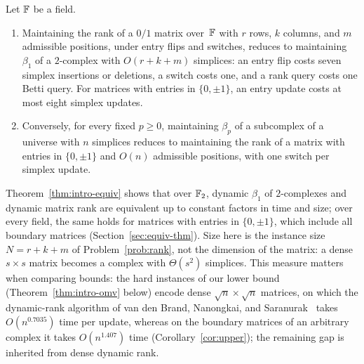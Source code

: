 \begin{theorem}\label{thm:intro-equiv}
Let $\mathbb{F}$ be a field.
\begin{enumerate}[label=(\roman*)]
\item Maintaining the rank of a $0/1$ matrix over~$\mathbb{F}$ with $r$ rows, $k$ columns, and $m$ admissible positions, under entry flips and switches, reduces to maintaining $\beta_1$ of a $2$-complex with $O(r+k+m)$ simplices: an entry flip costs seven simplex insertions or deletions, a switch costs one, and a rank query costs one Betti query. For matrices with entries in $\{0,\pm1\}$, an entry update costs at most eight simplex updates.
\item Conversely, for every fixed $p\ge0$, maintaining $\beta_p$ of a subcomplex of a universe with $n$ simplices reduces to maintaining the rank of a matrix with entries in $\{0,\pm1\}$ and $O(n)$ admissible positions, with one switch per simplex update.
\end{enumerate}
\end{theorem}

Theorem~\ref{thm:intro-equiv} shows that over $\mathbb{F}_2$, dynamic $\beta_1$ of $2$-complexes and dynamic matrix rank are equivalent up to constant factors in time and size; over every field, the same holds for matrices with entries in $\{0,\pm1\}$, which include all boundary matrices (Section~\ref{sec:equiv-thm}).
Size here is the instance size $N=r+k+m$ of Problem~\ref{prob:rank}, not the dimension of the matrix: a dense $s\times s$ matrix becomes a complex with $\Theta(s^2)$ simplices.
This measure matters when comparing bounds: the hard instances of our lower bound (Theorem~\ref{thm:intro-omv} below) encode dense $\sqrt n\times\sqrt n$ matrices, on which the dynamic-rank algorithm of van den Brand, Nanongkai, and Saranurak~\cite{vdBNS19} takes $O(n^{0.7035})$ time per update, whereas on the boundary matrices of an arbitrary complex it takes $O(n^{1.407})$ time (Corollary~\ref{cor:upper}); the remaining gap is inherited from dense dynamic rank.


